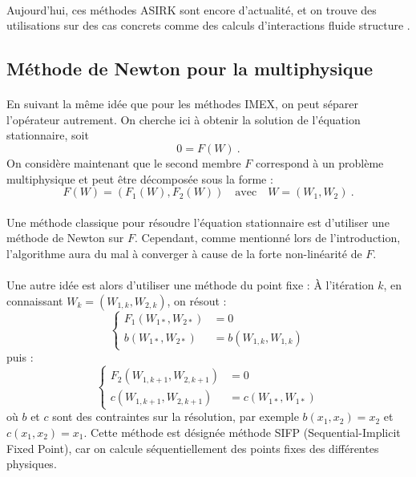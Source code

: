     \paragraph{}
    Aujourd'hui, ces méthodes ASIRK sont encore d'actualité, et on trouve des utilisations sur des cas concrets comme des calculs d'interactions fluide structure \cite{HuangPerssonZahr2019}.


  \subsection{Méthode de Newton pour la multiphysique}

    \paragraph{}
    En suivant la même idée que pour les méthodes IMEX, on peut séparer l'opérateur autrement.
    On cherche ici à obtenir la solution de l'équation stationnaire, soit
    \[0 = F\left(W\right)\ .\]
    On considère maintenant que le second membre $F$ correspond à un problème multiphysique et peut être décomposée sous la forme :
    \[F\left(W\right) = \left(F_1\left(W\right), F_2\left(W\right)\right) \quad\textrm{avec}\quad W = \left(W_1, W_2\right)\ .\]

    \paragraph{}
    Une méthode classique pour résoudre l'équation stationnaire est d'utiliser une méthode de Newton sur $F$.
    Cependant, comme mentionné lors de l'introduction, l'algorithme aura du mal à converger à cause de la forte non-linéarité de $F$.

    \paragraph{}
    Une autre idée est alors d'utiliser une méthode du point fixe :
    À l'itération $k$, en connaissant $W_k = \left(W_{1,k}, W_{2,k}\right)$, on résout :
    \[\left\{\begin{aligned}
      F_1\left(W_{1*}, W_{2*}\right) &= 0 \\
      b  \left(W_{1*}, W_{2*}\right) &= b\left(W_{1,k}, W_{1,k}\right)
    \end{aligned}\right.\]
    puis :
    \[\left\{\begin{aligned}
      F_2\left(W_{1,k+1}, W_{2,k+1}\right) &= 0 \\
      c  \left(W_{1,k+1}, W_{2,k+1}\right) &= c\left(W_{1*}, W_{1*}\right)
    \end{aligned}\right.\]
    où $b$ et $c$ sont des contraintes sur la résolution, par exemple $b\left(x_1, x_2\right) = x_2$ et $c\left(x_1, x_2\right) = x_1$.
    Cette méthode est désignée méthode SIFP (Sequential-Implicit Fixed Point), car on calcule séquentiellement des points fixes des différentes physiques.

